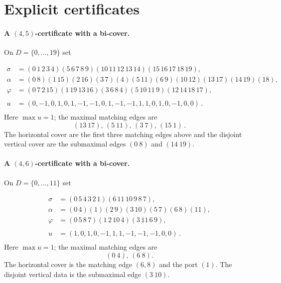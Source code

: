 \documentclass[11pt]{article}
\theoremstyle{remark}
\begin{document}

\section{Explicit certificates}\label{app:seeds}

\paragraph{A $(4,5)$-certificate with a bi-cover.} On $D=\{0,\dots,19\}$ set

\begin{equation}
\begin{aligned}
\sigma&=(0\,1\,2\,3\,4)(5\,6\,7\,8\,9)(10\,11\,12\,13\,14)(15\,16\,17\,18\,19),\\[2pt]
\alpha&=(0\,8)(1\,15)(2\,16)(3\,7)(4)(5\,11)(6\,9)(10\,12)(13\,17)(14\,19)(18),\\[2pt]
\varphi&=(0\,7\,2\,15)(1\,19\,13\,16)(3\,6\,8\,4)(5\,10\,11\,9)(12\,14\,18\,17) ,\\ \\[2pt]
u&=(0,-1,0,1,0,1,-1,-1,0,1,-1,-1, 1,1,0,1,0,-1,0,0) \, .\\ 
\end{aligned}
\label{eq:C45}
\end{equation}
Here $\max u=1$; the maximal matching edges are \[(13\ 17),\,(5\ 11),\,(3\ 7),\,(15\ 1) \, .\]
The horizontal cover are the first three matching edges above and the
disjoint vertical cover are the submaximal edges $(0\ 8)$ and $(14\ 19)$. 




\paragraph{A $(4,6)$-certificate with a bi-cover.} On $D=\{0,\dots,11\}$ set

\begin{equation}
\begin{aligned}
\sigma&=(0\,5\,4\,3\,2\,1)(6\,11\,10\,9\,8\,7),\\[2pt]
\alpha&=(0\,4)(1)(2\,9)(3\,10)(5\,7)(6\,8)(11),\\[2pt]
\varphi&=(0\,5\,8\,7)(1\,2\,10\,4)(3\,11\,6\,9),\\ \\[2pt]
u&=(1,0,1,0,-1,1,1,-1,-1,-1,0,0) \, . \\
\end{aligned}
\label{eq:C46}
\end{equation}
Here $\max u=1$; the maximal matching edges are 
\[(0\ 4),\,(6\ 8).\]
The horizontal cover is the matching edge $(6,8)$ and the port $(1)$. 
The disjoint vertical data is the submaximal edge $(3\ 10)$.
\end{document}

